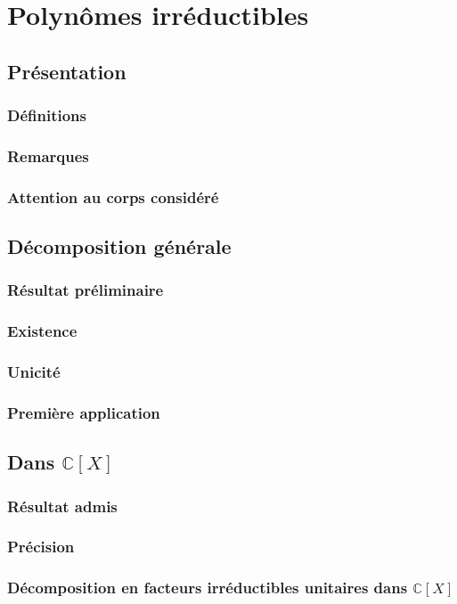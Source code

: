 \documentclass[12pt,a4paper,french]{book}
\begin{document}
	\section{Polynômes irréductibles}
		\subsection{Présentation}
			\subsubsection{Définitions}
			\subsubsection{Remarques}
			\subsubsection{Attention au corps considéré}
		\subsection{Décomposition générale}
			\subsubsection{Résultat préliminaire}
			\subsubsection{Existence}
			\subsubsection{Unicité}
			\subsubsection{Première application}
		\subsection{Dans $\mathbb{C}[X]$}
			\subsubsection{Résultat admis}
			\subsubsection{Précision}
			\subsubsection{Décomposition en facteurs irréductibles unitaires dans $\mathbb{C}[X]$}
\end{document}
